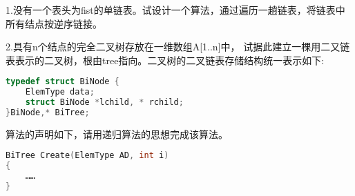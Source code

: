 1.没有一个表头为fist的单链表。试设计一个算法，通过遍历一趟链表，将链表中所有结点按逆序链接。

2.具有n个结点的完全二叉树存放在一维数组A[1..n]中， 试据此建立一棵用二又链表表示的二叉树，根由tree指向。二叉树的二叉链表存储结构统一表示如下:
\begin{lstlisting}[language=cpp]
typedef struct BiNode {
    ElemType data;
    struct BiNode *lchild, * rchild;
}BiNode,* BiTree;
\end{lstlisting}
算法的声明如下，请用递归算法的思想完成该算法。
\begin{lstlisting}[language=cpp]
BiTree Create(ElemType AD, int i)
{
    ……
}
\end{lstlisting}
